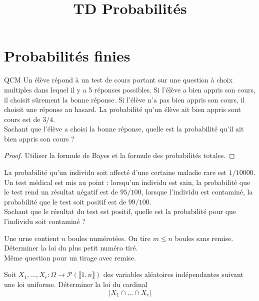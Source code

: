 \documentclass[french,a4paper]{article}
\title{TD Probabilités}
\theoremstyle{plain}
\theoremstyle{definition}
\theoremstyle{remark}
\begin{document}
\maketitle

\section{Probabilités finies}

\begin{ex}{QCM}
	Un élève répond à un test de cours portant sur une question à choix multiples dans lequel il y a 5 réponses possibles. Si l'élève a bien appris son cours, il choisit sûrement la bonne réponse. Si l'élève n'a pas bien appris son cours, il choisit une réponse au hasard. La probabilité qu'un élève ait bien appris sont cours est de $3/4$. \\ Sachant que l'élève a choisi la bonne réponse, quelle est la probabilité qu'il ait bien appris son cours ?
\end{ex}
\begin{proof}
	Utiliser la formule de Bayes et la formule des probabilités totales.
\end{proof}

\begin{ex}{}
	La probabilité qu'un individu soit affecté d'une certaine maladie rare est $1/10000$. Un test médical est mis au point : lorsqu'un individu est sain, la probabilité que le test rend un résultat négatif est de $95/100$, lorsque l'individu est contaminé, la probabilité que le test soit positif est de $99/100$. \\ Sachant que le résultat du test est positif, quelle est la probabilité pour que l'individu soit contaminé ?
\end{ex}

\begin{ex}{}
	Une urne contient $n$ boules numérotées. On tire $m\leqslant n$ boules sans remise.\\ Déterminer la loi du plus petit numéro tiré. \\ Même question pour un tirage avec remise.
\end{ex}

\begin{ex}{}
	Soit $X_1,\ldots,X_r:\Omega\to\mathcal{P}(\llbracket1,n\rrbracket)$ des variables aléatoires indépendantes suivant une loi uniforme. Déterminer la loi du cardinal $$\lvert X_1\cap\ldots\cap X_r\rvert$$
\end{ex}
\end{document}
